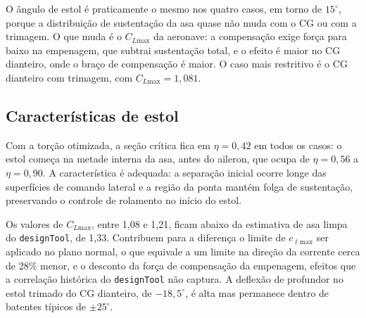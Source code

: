 O ângulo de estol é praticamente o mesmo nos quatro casos, em torno de
$15^\circ$, porque a distribuição de sustentação da asa quase não muda
com o CG ou com a trimagem. O que muda é o $C_{L\mathrm{max}}$ da
aeronave: a compensação exige força para baixo na empenagem, que subtrai
sustentação total, e o efeito é maior no CG dianteiro, onde o braço de
compensação é maior. O caso mais restritivo é o CG dianteiro com trimagem,
com $C_{L\mathrm{max}} = 1{,}081$.

\subsection*{Características de estol}

Com a torção otimizada, a seção crítica fica em $\eta = 0{,}42$ em todos
os casos: o estol começa na metade interna da asa, antes do aileron, que
ocupa de $\eta = 0{,}56$ a $\eta = 0{,}90$. A característica é adequada: a
separação inicial ocorre longe das superfícies de comando lateral e a
região da ponta mantém folga de sustentação, preservando o controle de
rolamento no início do estol.

Os valores de $C_{L\mathrm{max}}$, entre 1,08 e 1,21, ficam abaixo da
estimativa de asa limpa do \texttt{designTool}, de 1,33. Contribuem para a
diferença o limite de $c_{\ell\mathrm{max}}$ ser aplicado no plano normal,
o que equivale a um limite na direção da corrente cerca de 28\% menor, e o
desconto da força de compensação da empenagem, efeitos que a correlação
histórica do \texttt{designTool} não captura. A deflexão de profundor no
estol trimado do CG dianteiro, de $-18{,}5^\circ$, é alta mas permanece
dentro de batentes típicos de $\pm 25^\circ$.
